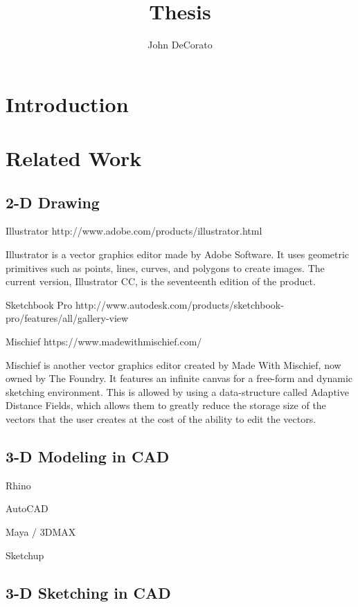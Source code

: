 \documentclass{article}
\title{Thesis}
\author{John DeCorato}
\date{ }
\begin{document}
 
\maketitle
 
\tableofcontents
 
\section{Introduction}

\section{Related Work}

\subsection{2-D Drawing}

Illustrator http://www.adobe.com/products/illustrator.html

Illustrator is a vector graphics editor made by Adobe Software. It uses geometric primitives such as points, lines, curves, and polygons to create images. The current version, Illustrator CC, is the seventeenth edition of the product.

Sketchbook Pro http://www.autodesk.com/products/sketchbook-pro/features/all/gallery-view

Mischief https://www.madewithmischief.com/

Mischief is another vector graphics editor created by Made With Mischief, now owned by The Foundry. It features an infinite canvas for a free-form and dynamic sketching environment. This is allowed by using a data-structure called Adaptive Distance Fields, which allows them to greatly reduce the storage size of the vectors that the user creates at the cost of the ability to edit the vectors. 


\subsection{3-D Modeling in CAD}

Rhino

AutoCAD

Maya / 3DMAX

Sketchup

\subsection{3-D Sketching in CAD}
\end{document}
